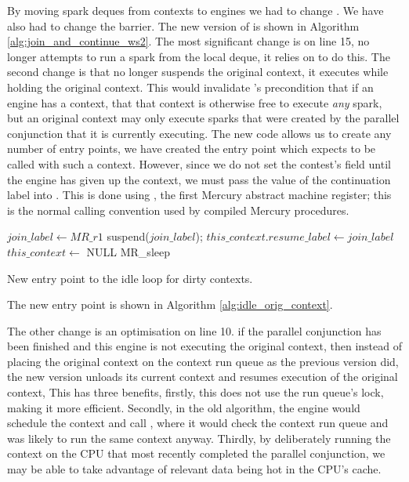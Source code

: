 By moving spark deques from contexts to engines we had to change \idle.
We have also had to change the \joinandcontinue barrier.
The new version of \joinandcontinue is shown in Algorithm
\ref{alg:join_and_continue_ws2}.
The most significant change is on line 15,
\joinandcontinue no longer attempts to run a spark from the local deque,
it relies on \idle to do this.
The second change is that \joinandcontinue no longer suspends the original
context, it executes \idle while holding the original context.
This would invalidate \idle's precondition that if an engine has a context,
that that context is otherwise free to execute \emph{any} spark,
but an original context may only execute sparks that were created by the
parallel conjunction that it is currently executing.
The new \idle code allows us to create any number of entry points,
we have created the \idleorigcontext entry point which expects to be called
with such a context.
However, since we do not set the contest's  field until
the engine has given up the context,
we must pass the value of the continuation label into \idleorigcontext.
This is done using , the first Mercury abstract machine
register;
this is the normal calling convention used by compiled Mercury procedures.

\begin{algorithm}[tbp]
\begin{algorithmic}
        \State $join\_label \gets MR\_r1$
        \State {}
        \State suspend($join\_label$);
        \State $this\_context.resume\_label \gets join\_label$
        \State $this\_context \gets$ NULL
        \State {}
        \State {}
        \Goto MR\_sleep
    \EndProcedure
\end{algorithmic}
\caption{New entry point to the idle loop for dirty contexts.}
\label{alg:idle_orig_context}
\end{algorithm}

The new entry point \idleorigcontext is shown in Algorithm
\ref{alg:idle_orig_context}.

The other change is an optimisation on line 10.
if the parallel conjunction has been finished and this engine is not
executing the original context,
then instead of placing the original context on the context run queue as the
previous version did,
the new version unloads its current context and resumes execution of the
original context,
This has three benefits,
firstly, this does not use the run queue's lock,
making it more efficient.
Secondly, in the old algorithm, the engine would schedule the context and
call \idle,
where it would check the context run queue and was likely to run the same
context anyway.
Thirdly, by deliberately running the context on the CPU that most
recently completed the parallel conjunction,
we may be able to take advantage of relevant data being hot in the CPU's
cache.








